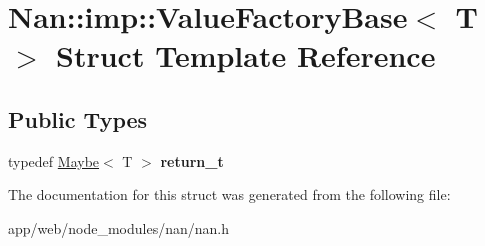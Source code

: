 \hypertarget{struct_nan_1_1imp_1_1_value_factory_base}{}\section{Nan\+:\+:imp\+:\+:Value\+Factory\+Base$<$ T $>$ Struct Template Reference}
\label{struct_nan_1_1imp_1_1_value_factory_base}
\subsection*{Public Types}
\begin{DoxyCompactItemize}
\item 
\mbox{\label{struct_nan_1_1imp_1_1_value_factory_base_aa3bf1cd67f9bc9391ea294dd31235365}} 
typedef \hyperlink{class_nan_1_1_maybe}{Maybe}$<$ T $>$ {\bfseries return\+\_\+t}
\end{DoxyCompactItemize}


The documentation for this struct was generated from the following file\+:\begin{DoxyCompactItemize}
\item 
app/web/node\+\_\+modules/nan/nan.\+h\end{DoxyCompactItemize}
